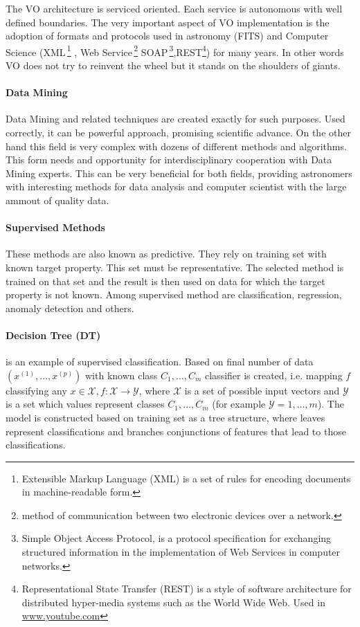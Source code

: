 \documentclass[a4paper,10pt,oneside,onecolumn]{article}
\begin{document}

    The VO architecture is serviced oriented. Each service is
    autonomous with well defined boundaries. The very important aspect
    of VO implementation is the adoption of formats and protocols used
    in astronomy (FITS) and Computer Science
    (XML\,\footnote{Extensible Markup Language (XML) is a set of rules
      for encoding documents in machine-readable form.} , Web
    Service\,\footnote{method of communication between two electronic
      devices over a network.}  SOAP\,\footnote{Simple Object Access
      Protocol, is a protocol specification for exchanging structured
      information in the implementation of Web Services in computer
      networks.},REST\footnote{Representational State Transfer (REST)
      is a style of software architecture for distributed hyper-media
      systems such as the World Wide Web. Used in
      \url{www.youtube.com} }) for many years. In other words VO does
    not try to reinvent the wheel but it stands on the shoulders of
    giants.


\paragraph{Data Mining}
Data Mining and related techniques are created exactly for such
purposes. Used correctly, it can be powerful approach, promising
scientific advance. On the other hand this field is very complex with
dozens of different methods and algorithms. This form needs and
opportunity for interdisciplinary cooperation with Data Mining
experts. This can be very beneficial for both fields, providing
astronomers with interesting methods for data analysis and computer
scientist with the large ammout of quality data.
\paragraph{Supervised Methods}
These methods are also known as predictive\cite{ball2010data}. They
rely on training set with known target property. This set must be
representative. The selected method is trained on that set and the
result is then used on data for which the target property is not
known. Among supervised method are classification, regression, anomaly
detection and others.

\paragraph{Decision Tree (DT)} is an example of supervised
classification. Based on final number of data
$(x^{(1)},\ldots,x^{(p)})$ with known class $C_1,\ldots, C_m$
classifier is created, i.e. mapping $f$ classifying any $x \in
\mathcal{X}, f:\mathcal{X}\rightarrow \mathcal{Y}$, where
$\mathcal{X}$ is a set of possible input vectors and $\mathcal{Y}$ is
a set which values represent classes $C_1,\ldots, C_m$ (for example
$\mathcal{Y} = {1,\ldots,m}$). The model is constructed based on
training set as a tree structure, where leaves represent
classifications and branches conjunctions of features that lead to
those classifications.
\end{document}
